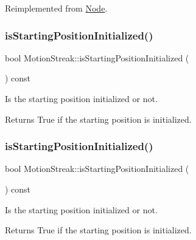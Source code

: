 Reimplemented from \hyperlink{classNode_ae6ce32d2088e2bb3426608334f1091c5}{Node}.

\mbox{\label{classMotionStreak_a68d95751d1dda2b0e293262bb49e54f5}} 
\subsubsection{\texorpdfstring{is\+Starting\+Position\+Initialized()}{isStartingPositionInitialized()}\hspace{0.1cm}{\footnotesize\ttfamily [1/2]}}
{\footnotesize\ttfamily bool Motion\+Streak\+::is\+Starting\+Position\+Initialized (\begin{DoxyParamCaption}{ }\end{DoxyParamCaption}) const\hspace{0.3cm}{\ttfamily [inline]}}

Is the starting position initialized or not.

\begin{DoxyReturn}{Returns}
True if the starting position is initialized. 
\end{DoxyReturn}
\mbox{\label{classMotionStreak_a68d95751d1dda2b0e293262bb49e54f5}} 
\subsubsection{\texorpdfstring{is\+Starting\+Position\+Initialized()}{isStartingPositionInitialized()}\hspace{0.1cm}{\footnotesize\ttfamily [2/2]}}
{\footnotesize\ttfamily bool Motion\+Streak\+::is\+Starting\+Position\+Initialized (\begin{DoxyParamCaption}{ }\end{DoxyParamCaption}) const\hspace{0.3cm}{\ttfamily [inline]}}

Is the starting position initialized or not.

\begin{DoxyReturn}{Returns}
True if the starting position is initialized. 
\end{DoxyReturn}
\mbox{\label{classMotionStreak_accbce67250d3b95ee9bf6b81c5854d44}} 
